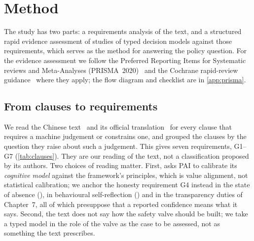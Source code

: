 \section{Method}
\label{sec:method}

The study has two parts: a requirements analysis of the \pol{} text, and a structured rapid evidence assessment of studies of typed decision models against those requirements, which serves as the method for answering the policy question.
For the evidence assessment we follow the Preferred Reporting Items for Systematic reviews and Meta-Analyses (PRISMA~2020)~\cite{page2021prisma} and the Cochrane rapid-review guidance~\cite{garritty2021cochrane} where they apply; the flow diagram and checklist are in \cref{app:prisma}.

\subsection{From clauses to requirements}
\label{sec:requirements}

We read the Chinese text~\cite{pol2text} and its official translation~\cite{pol2en} for every clause that requires a machine judgement or constrains one, and grouped the clauses by the question they raise about such a judgement.
This gives seven requirements, G1--G7 (\cref{tab:clauses}).
They are our reading of the text, not a classification proposed by its authors.
Two choices of reading matter.
First,  asks PAI to calibrate its \emph{cognitive model} against the framework's principles, which is value alignment, not statistical calibration; we anchor the honesty requirement G4 instead in the state of absence (), in behavioural self-reflection () and in the transparency duties of Chapter~7, all of which presuppose that a reported confidence means what it says.
Second, the text does not say how the safety valve should be built; we take a typed model in the role of the valve as the case to be assessed, not as something the text prescribes.


